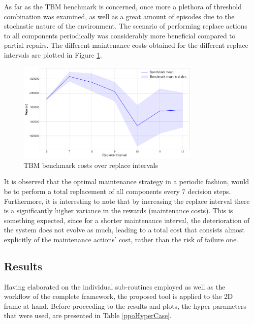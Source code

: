 \newpage

As far as the \gls{TBM} benchmark is concerned, once more a plethora of threshold combination was examined, as well as a great amount of episodes due to the stochastic nature of the environment. The scenario of performing replace actions to all components periodically was considerably more beneficial compared to partial repairs. The different maintenance costs obtained for the different replace intervals are plotted in Figure \ref{tbmRplIntervals}. 

\begin{figure}[H]
    \centering
    \includegraphics[width=0.8\textwidth]{Figures/tbmReplaceIntervals.png}
	\caption{\acrshort{TBM} benchmark costs over replace intervals}
	\label{tbmRplIntervals}
\end{figure}

It is observed that the optimal maintenance strategy in a periodic fashion, would be to perform a total replacement of all components every 7 decision steps. Furthermore, it is interesting to note that by increasing the replace interval there is a significantly higher variance in the rewards (maintenance costs). This is something expected, since for a shorter maintenance interval, the deterioration of the system does not evolve as much, leading to a total cost that consists almost explicitly of the maintenance actions' cost, rather than the risk of failure one.

\newpage


\subsection{Results}

Having elaborated on the individual sub-routines employed as well as the workflow of the complete framework, the proposed tool is applied to the 2D frame at hand. Before proceeding to the results and plots, the hyper-parameters that were used, are presented in Table \ref{ppoHyperCase}.

